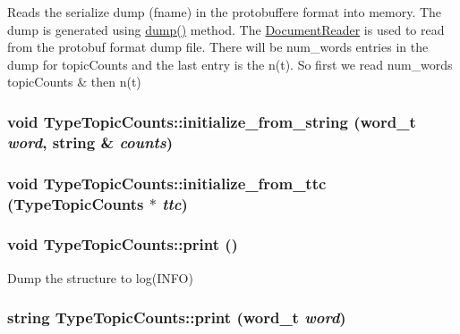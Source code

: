 Reads the serialize dump (fname) in the protobuffere format into memory. The dump is generated using \hyperlink{class_type_topic_counts_ad5b4a0efaccdf397d696ef3a59ff5bc5}{dump()} method. The \hyperlink{class_document_reader}{DocumentReader} is used to read from the protobuf format dump file. There will be num\_\-words entries in the dump for topicCounts and the last entry is the n(t). So first we read num\_\-words topicCounts \& then n(t) \hypertarget{class_type_topic_counts_a54768567ed8fbf4cd34f2ff7a5222190}{
\subsubsection[{initialize\_\-from\_\-string}]{\setlength{\rightskip}{0pt plus 5cm}void TypeTopicCounts::initialize\_\-from\_\-string (word\_\-t {\em word}, \/  string \& {\em counts})}}
\label{class_type_topic_counts_a54768567ed8fbf4cd34f2ff7a5222190}
\hypertarget{class_type_topic_counts_ae8c2f500e74a2f6a6bb1f6e830c66142}{
\subsubsection[{initialize\_\-from\_\-ttc}]{\setlength{\rightskip}{0pt plus 5cm}void TypeTopicCounts::initialize\_\-from\_\-ttc ({\bf TypeTopicCounts} $\ast$ {\em ttc})}}
\label{class_type_topic_counts_ae8c2f500e74a2f6a6bb1f6e830c66142}
\hypertarget{class_type_topic_counts_a126d74c21ec8eda16a875711b9879f86}{
\subsubsection[{print}]{\setlength{\rightskip}{0pt plus 5cm}void TypeTopicCounts::print ()}}
\label{class_type_topic_counts_a126d74c21ec8eda16a875711b9879f86}
Dump the structure to log(INFO) \hypertarget{class_type_topic_counts_a8aecfbf940bbc235954488ef3d107075}{
\subsubsection[{print}]{\setlength{\rightskip}{0pt plus 5cm}string TypeTopicCounts::print (word\_\-t {\em word})}}
